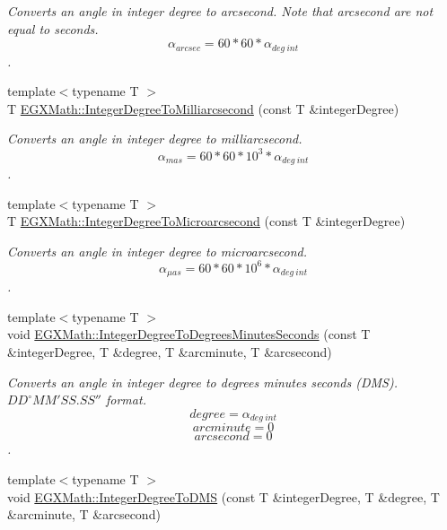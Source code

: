 \begin{DoxyCompactItemize}
\begin{DoxyCompactList}\small\item\em Converts an angle in integer degree to arcsecond. Note that arcsecond are not equal to seconds. \[\alpha_{arcsec}=60 * 60 * \alpha_{deg\ int}\]. \end{DoxyCompactList}\item 
{\footnotesize template$<$typename T $>$ }\\T \mbox{\hyperlink{group___e_g_x_math-_conversions-_angle_conversions-_integer_degree_gadc43f22e832cd8fcf16b7bd2269ae348}{E\+G\+X\+Math\+::\+Integer\+Degree\+To\+Milliarcsecond}} (const T \&integer\+Degree)
\begin{DoxyCompactList}\small\item\em Converts an angle in integer degree to milliarcsecond. \[\alpha_{mas}=60 * 60 * 10^3 * \alpha_{deg\ int} \]. \end{DoxyCompactList}\item 
{\footnotesize template$<$typename T $>$ }\\T \mbox{\hyperlink{group___e_g_x_math-_conversions-_angle_conversions-_integer_degree_ga69179d6082764595c7014805e1f6b31e}{E\+G\+X\+Math\+::\+Integer\+Degree\+To\+Microarcsecond}} (const T \&integer\+Degree)
\begin{DoxyCompactList}\small\item\em Converts an angle in integer degree to microarcsecond. \[\alpha_{\mu as}=60 * 60 * 10^6 * \alpha_{deg\ int}\]. \end{DoxyCompactList}\item 
{\footnotesize template$<$typename T $>$ }\\void \mbox{\hyperlink{group___e_g_x_math-_conversions-_angle_conversions-_integer_degree_ga204317877546ea6bbafe5ff558f55a16}{E\+G\+X\+Math\+::\+Integer\+Degree\+To\+Degrees\+Minutes\+Seconds}} (const T \&integer\+Degree, T \&degree, T \&arcminute, T \&arcsecond)
\begin{DoxyCompactList}\small\item\em Converts an angle in integer degree to degrees minutes seconds (D\+MS). ${DD}^{\circ}{MM}'{SS.SS}''$ format. \[degree=\alpha_{deg\ int}\] \[arcminute= 0\] \[arcsecond= 0\]. \end{DoxyCompactList}\item 
{\footnotesize template$<$typename T $>$ }\\void \mbox{\hyperlink{group___e_g_x_math-_conversions-_angle_conversions-_integer_degree_gaf76779bcc23268b41d4c3a7610d60eaf}{E\+G\+X\+Math\+::\+Integer\+Degree\+To\+D\+MS}} (const T \&integer\+Degree, T \&degree, T \&arcminute, T \&arcsecond)

\end{DoxyCompactItemize}
